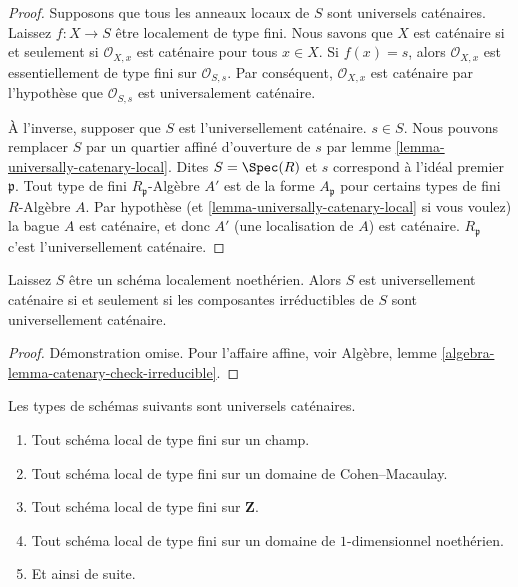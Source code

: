 \begin{proof}
Supposons que tous les anneaux locaux de $S$ sont universels caténaires. Laissez $f : X \to S$ être localement de type fini. Nous savons que $X$ est caténaire si et seulement si $\mathcal{O}_{X, x}$ est caténaire pour tous $x \in X$. Si $f(x) = s$, alors $\mathcal{O}_{X, x}$ est essentiellement de type fini sur $\mathcal{O}_{S, s}$. Par conséquent, $\mathcal{O}_{X, x}$ est caténaire par l'hypothèse que $\mathcal{O}_{S, s}$ est universalement caténaire.

\medskip\noindent

À l'inverse, supposer que $S$ est l'universellement caténaire. $s \in S$. Nous pouvons remplacer $S$ par un quartier affiné d'ouverture de $s$ par lemme \ref{lemma-universally-catenary-local}. Dites $S = \Spec(R)$
et $s$ correspond à l'idéal premier $\mathfrak p$. Tout type de fini $R_{\mathfrak p}$-Algèbre $A'$ est de la forme
$A_{\mathfrak p}$ pour certains types de fini $R$-Algèbre $A$. Par hypothèse (et \ref{lemma-universally-catenary-local} si vous voulez) la bague $A$ est caténaire, et donc $A'$ (une localisation de $A$) est caténaire. $R_{\mathfrak p}$ c'est l'universellement caténaire.

\end{proof}

\begin{lemma}

\label{lemma-catenary-check-irreducible}
Laissez $S$ être un schéma localement noethérien. Alors $S$ est universellement caténaire si et seulement si les composantes irréductibles de $S$ sont universellement caténaire.
\end{lemma}

\begin{proof}
Démonstration omise. Pour l'affaire affine, voir Algèbre, lemme \ref{algebra-lemma-catenary-check-irreducible}.
\end{proof}

\begin{lemma}

\label{lemma-ubiquity-uc}
Les types de schémas suivants sont universels caténaires.
\begin{enumerate}
\item Tout schéma local de type fini sur un champ.
\item Tout schéma local de type fini sur un domaine de Cohen--Macaulay.
\item Tout schéma local de type fini sur $\mathbf{Z}$.
\item Tout schéma local de type fini sur un domaine de $1$-dimensionnel noethérien.
\item Et ainsi de suite.
\end{enumerate}

\end{lemma}


